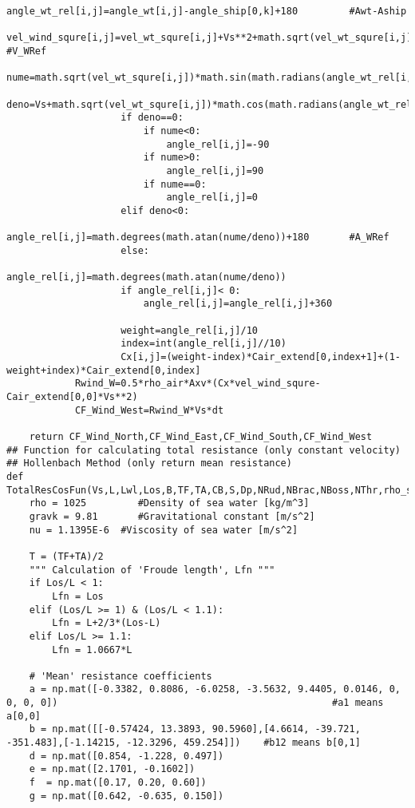 \begin{lstlisting}[caption=Testing codes (\autoref{TestResults}), label=TestCodes]
                    angle_wt_rel[i,j]=angle_wt[i,j]-angle_ship[0,k]+180         #Awt-Aship
                    vel_wind_squre[i,j]=vel_wt_squre[i,j]+Vs**2+math.sqrt(vel_wt_squre[i,j])*Vs*math.cos(math.radians(angle_wt_rel[i,j])) #V_WRef
                    nume=math.sqrt(vel_wt_squre[i,j])*math.sin(math.radians(angle_wt_rel[i,j]))
                    deno=Vs+math.sqrt(vel_wt_squre[i,j])*math.cos(math.radians(angle_wt_rel[i,j]))
                    if deno==0:
                        if nume<0:
                            angle_rel[i,j]=-90
                        if nume>0:
                            angle_rel[i,j]=90
                        if nume==0:
                            angle_rel[i,j]=0
                    elif deno<0:
                        angle_rel[i,j]=math.degrees(math.atan(nume/deno))+180       #A_WRef
                    else:
                        angle_rel[i,j]=math.degrees(math.atan(nume/deno))
                    if angle_rel[i,j]< 0:
                        angle_rel[i,j]=angle_rel[i,j]+360
                    
                    weight=angle_rel[i,j]/10
                    index=int(angle_rel[i,j]//10)
                    Cx[i,j]=(weight-index)*Cair_extend[0,index+1]+(1-weight+index)*Cair_extend[0,index]
            Rwind_W=0.5*rho_air*Axv*(Cx*vel_wind_squre-Cair_extend[0,0]*Vs**2)
            CF_Wind_West=Rwind_W*Vs*dt

    return CF_Wind_North,CF_Wind_East,CF_Wind_South,CF_Wind_West
## Function for calculating total resistance (only constant velocity)
## Hollenbach Method (only return mean resistance)
def TotalResCosFun(Vs,L,Lwl,Los,B,TF,TA,CB,S,Dp,NRud,NBrac,NBoss,NThr,rho_sea,nu_sea,g,dt): 
    rho = 1025         #Density of sea water [kg/m^3]
    gravk = 9.81       #Gravitational constant [m/s^2]
    nu = 1.1395E-6  #Viscosity of sea water [m/s^2]

    T = (TF+TA)/2
    """ Calculation of 'Froude length', Lfn """
    if Los/L < 1:
        Lfn = Los
    elif (Los/L >= 1) & (Los/L < 1.1):
        Lfn = L+2/3*(Los-L)
    elif Los/L >= 1.1:
        Lfn = 1.0667*L

    # 'Mean' resistance coefficients
    a = np.mat([-0.3382, 0.8086, -6.0258, -3.5632, 9.4405, 0.0146, 0, 0, 0, 0])                                                #a1 means a[0,0]
    b = np.mat([[-0.57424, 13.3893, 90.5960],[4.6614, -39.721, -351.483],[-1.14215, -12.3296, 459.254]]) 	#b12 means b[0,1]
    d = np.mat([0.854, -1.228, 0.497])
    e = np.mat([2.1701, -0.1602])
    f  = np.mat([0.17, 0.20, 0.60])
    g = np.mat([0.642, -0.635, 0.150])


\end{lstlisting}
